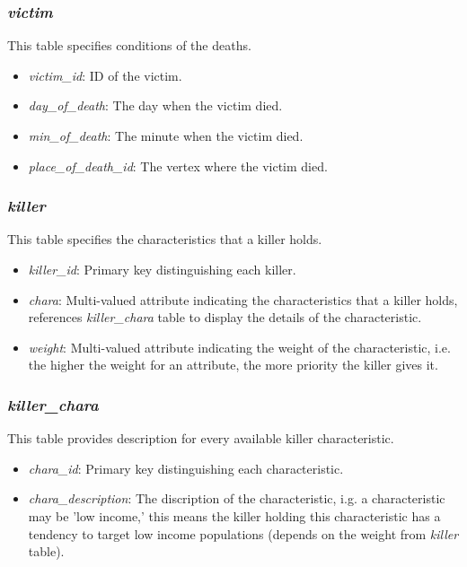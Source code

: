 \documentclass{article}
\begin{document}
\subsubsection{\textit{victim}}
This table specifies conditions of the deaths.

\begin{itemize}
    \item \textit{victim\_id}: ID of the victim.
    \item \textit{day\_of\_death}: The day when the victim died.
    \item \textit{min\_of\_death}: The minute when the victim died.
    \item \textit{place\_of\_death\_id}: The vertex where the victim died.
\end{itemize}

\subsubsection{\textit{killer}}
This table specifies the characteristics that a killer holds.

\begin{itemize}
    \item \textit{killer\_id}: Primary key distinguishing each killer.
    \item \textit{chara}: Multi-valued attribute indicating the characteristics that a killer holds, references \textit{killer\_chara} table to display the details of the characteristic.
    \item \textit{weight}: Multi-valued attribute indicating the weight of the characteristic, i.e. the higher the weight for an attribute, the more priority the killer gives it.
\end{itemize}

\subsubsection{\textit{killer\_chara}}
This table provides description for every available killer characteristic.

\begin{itemize}
    \item \textit{chara\_id}: Primary key distinguishing each characteristic.
    \item \textit{chara\_description}: The discription of the characteristic, i.g. a characteristic may be 'low income,' this means the killer holding this characteristic has a tendency to target low income populations (depends on the weight from \textit{killer} table).
\end{itemize}
\end{document}
